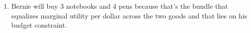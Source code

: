 \documentclass{article}
\begin{document}
\begin{enumerate}
\begin{enumerate}
	\item Bernie will buy 3 notebooks and 4 pens because that's the bundle that equalizes marginal utility per dollar across the two goods and that lies on his budget constraint.
	
	\end{enumerate}

\end{enumerate}
\end{document}
